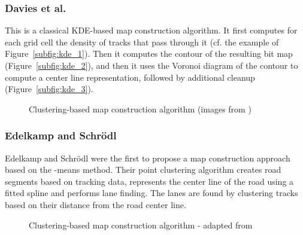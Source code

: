 \documentclass[natbib]{svjour3}                    \smartqed  \usepackage[table]{xcolor}
\begin{document}
\subsubsection{Davies et al. \protect\cite{Davies:2006:SDR:1175887.1176088}}
This is a classical KDE-based map construction algorithm. It first computes for each grid cell the density of tracks that pass through it (cf. the example of Figure~\ref{subfig:kde_1}). Then it computes the contour of the resulting bit map (Figure~\ref{subfig:kde_2}), and then it uses the Voronoi diagram of the contour to compute a center line representation, followed by additional cleanup (Figure~\ref{subfig:kde_3}).

\begin{figure}[htbp]
 \begin{center} 
 \end{center}
\caption{Clustering-based map construction algorithm (images from \cite{Davies:2006:SDR:1175887.1176088})}
\label{fig:kde}
\end{figure}


\subsubsection{Edelkamp and Schr\"odl \protect\cite{edelkamp:2003:rpmi}}

Edelkamp and Schr\"odl \cite{edelkamp:2003:rpmi} were the first to propose a map construction approach based on the -means method. Their point clustering algorithm creates road segments based on tracking data, represents the center line of the road using a fitted spline and performs lane finding. The lanes are found by clustering tracks based on their distance from the road center line.

\begin{figure}[htbp]
 \begin{center} 
 \end{center}
\caption{Clustering-based map construction algorithm - adapted from \cite{edelkamp:2003:rpmi}}
\label{fig:edelkamp}
\end{figure}
 
\end{document}
